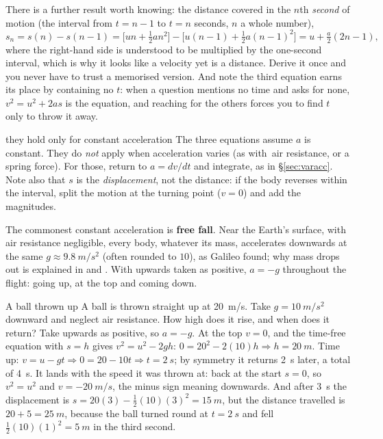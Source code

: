 There is a further result worth knowing: the distance covered in the $n$th \emph{second} of motion
(the interval from $t=n-1$ to $t=n$ seconds, $n$ a whole number),
\[
s_n=s(n)-s(n-1)=\big[un+\tfrac12an^2\big]-\big[u(n-1)+\tfrac12a(n-1)^2\big]=u+\tfrac{a}{2}(2n-1),
\]
where the right-hand side is understood to be multiplied by the one-second interval, which is why it
looks like a velocity yet is a distance. Derive it once and you never have to trust a memorised
version. And
note the third equation earns its place by containing no $t$: when a question mentions no time and asks
for none, $v^2=u^2+2as$ is the equation, and reaching for the others forces you to find $t$ only to throw
it away.


\begin{trapbox}{they hold only for constant acceleration}
The three equations assume $a$ is constant. They do \emph{not} apply when acceleration varies (as with\
air resistance, or a spring force). For those, return to $a=dv/dt$ and integrate, as in
\S\ref{sec:varacc}. Note also that $s$ is the \emph{displacement}, not the distance: if the body
reverses within the interval, split the motion at the turning point ($v=0$) and add the magnitudes.
\end{trapbox}

The commonest constant acceleration is \textbf{free fall}. Near the Earth's surface, with air
resistance negligible, every body, whatever its mass, accelerates downwards at the same
$g\approx\SI{9.8}{m/s^2}$ (often rounded to $10$), as Galileo found; why mass drops out is explained in
\chref{ch:newton} and \chref{ch:gravitation}. With upwards taken as positive, $a=-g$ throughout the
flight: going up, at the top and coming down.

\begin{exbox}{A ball thrown up}
A ball is thrown straight up at \SI{20}{m/s}. Take $g=\SI{10}{m/s^2}$ downward and neglect air
resistance. How high does it rise, and when does it return? Take upwards as positive, so $a=-g$. At the top $v=0$, and the time-free equation with $s=h$ gives
$v^2=u^2-2gh$: $0=20^2-2(10)h\Rightarrow h=\SI{20}{m}$.
Time up: $v=u-gt\Rightarrow0=20-10t\Rightarrow t=\SI{2}{s}$; by symmetry it returns \SI{2}{s} later, a
total of \SI{4}{s}. It lands with the speed it was thrown at: back at the start $s=0$, so
$v^2=u^2$ and $v=-\SI{20}{m/s}$, the minus sign meaning downwards. And after \SI{3}{s} the displacement is
$s=20(3)-\tfrac12(10)(3)^2=\SI{15}{m}$, but the distance travelled is $20+5=\SI{25}{m}$, because the ball turned
round at $t=\SI{2}{s}$ and fell $\tfrac12(10)(1)^2=\SI{5}{m}$ in the third second. \ans{\SI{20}{m}; \SI{4}{s}}
\end{exbox}

